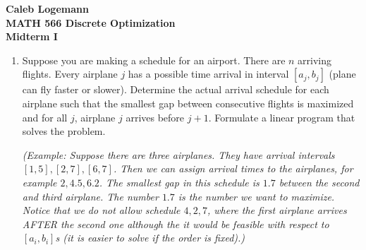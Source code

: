 \documentclass[11pt, oneside]{article}
\begin{document}
\noindent \textbf{\Large{Caleb Logemann \\
MATH 566 Discrete Optimization\\
Midterm I
}}

%
\begin{enumerate}
  \item %
    Suppose you are making a schedule for an airport.
    There are $n$ arriving flights.
    Every airplane $j$ has a possible time arrival  in interval $[a_j,b_j]$
    (plane can fly faster or slower).
    Determine the actual arrival schedule for each airplane such that the
    smallest gap between consecutive flights is maximized
    and for all $j$, airplane $j$ arrives before $j+1$.
    Formulate a linear program that solves the problem.

    \emph{
      (Example: Suppose there are three airplanes. They have arrival intervals $[1,5],[2,7],[6,7]$.
      Then we can assign arrival times to the airplanes, for example $2,4.5,6.2$. The smallest
      gap in this schedule is $1.7$ between the second and third airplane. The number $1.7$
      is the number we want to maximize. Notice that we do not allow schedule $4,2,7$, where the first
      airplane arrives AFTER the second one although the it would be feasible with respect to $[a_i,b_i]$s
      (it is easier to solve if the order is fixed).)
    }


\end{enumerate}
\end{document}
